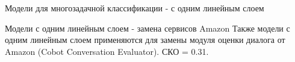 \begin{frame}{Модели для многозадачной классификации - с одним линейным слоем}
\begin{table}[htbp]
\caption{Точность на различных задачах для разных типов однозадачных моделей, в сравнении с многозадачными. }
\end{table}
\end{frame}

\begin{frame}{Модели с одним линейным слоем - замена сервисов Amazon}
Также модели с одним линейным слоем применяются для замены модуля оценки диалога от Amazon (Cobot Conversation Evaluator). СКО = 0.31.
\end{frame}

